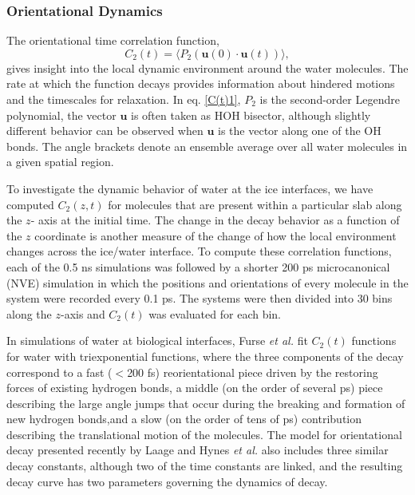 \documentclass[11pt]{article}
\begin{document}
\begin{doublespace}
\subsubsection{Orientational Dynamics}
The orientational time correlation function,
\begin{equation}\label{C(t)1}
  C_{2}(t)=\langle P_{2}(\mathbf{u}(0) \cdot \mathbf{u}(t)) \rangle,
\end{equation}
gives insight into the local dynamic environment around the water
molecules.  The rate at which the function decays provides information
about hindered motions and the timescales for relaxation.  In
eq. \eqref{C(t)1}, $P_{2}$ is the second-order Legendre polynomial,
the vector $\mathbf{u}$ is often taken as HOH bisector, although
slightly different behavior can be observed when $\mathbf{u}$ is the
vector along one of the OH bonds.  The angle brackets denote an
ensemble average over all water molecules in a given spatial region.

To investigate the dynamic behavior of water at the ice interfaces, we
have computed $C_{2}(z,t)$ for molecules that are present within a
particular slab along the $z$- axis at the initial time.  The change
in the decay behavior as a function of the $z$ coordinate is another
measure of the change of how the local environment changes across the
ice/water interface.  To compute these correlation functions, each of
the 0.5 ns simulations was followed by a shorter 200 ps microcanonical
(NVE) simulation in which the positions and orientations of every
molecule in the system were recorded every 0.1 ps. The systems were
then divided into 30 bins along the $z$-axis and $C_2(t)$ was
evaluated for each bin.

In simulations of water at biological interfaces, Furse {\em et al.}
fit $C_2(t)$ functions for water with triexponential
functions,\cite{Furse08} where the three components of the decay
correspond to a fast ($<$200 fs) reorientational piece driven by the
restoring forces of existing hydrogen bonds, a middle (on the order of
several ps) piece describing the large angle jumps that occur during
the breaking and formation of new hydrogen bonds,and a slow (on the
order of tens of ps) contribution describing the translational motion
of the molecules.  The model for orientational decay presented
recently by Laage and Hynes {\em et al.}\cite{Laage08,Laage11} also
includes three similar decay constants, although two of the time
constants are linked, and the resulting decay curve has two parameters
governing the dynamics of decay. 


\end{doublespace}
\end{document}
